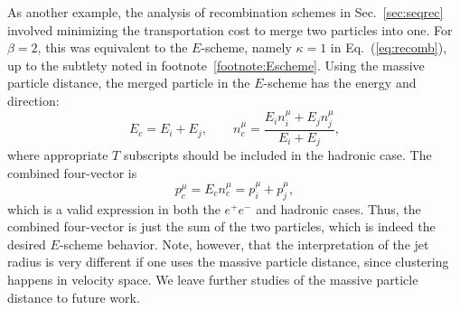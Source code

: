 \documentclass[letterpaper,11pt]{article}
\DeclareRobustCommand{\Sec}[1]{Sec.~\ref{#1}}
\DeclareRobustCommand{\Eq}[1]{Eq.~(\ref{#1})}
\begin{document}
As another example, the analysis of recombination schemes in \Sec{sec:seqrec} involved minimizing the transportation cost to merge two particles into one.
%
For $\beta = 2$, this was equivalent to the $E$-scheme, namely $\kappa = 1$ in \Eq{eq:recomb}, up to the subtlety noted in footnote~\ref{footnote:Escheme}.
%
Using the massive particle distance, the merged particle in the $E$-scheme has the energy and direction:
%
\begin{equation}
%
E_c = E_i + E_j, \qquad n^\mu_c = \frac{E_i n_i^\mu + E_j n_j^\mu}{E_i + E_j},
%
\end{equation}
%
where appropriate $T$ subscripts should be included in the hadronic case.
%
The combined four-vector is
%
\begin{equation}
p^\mu_c = E_c n^\mu_c = p_i^\mu + p_j^\mu,
\end{equation}
%
which is a valid expression in both the $e^+e^-$ and hadronic cases.
%
Thus, the combined four-vector is just the sum of the two particles, which is indeed the desired $E$-scheme behavior.
%
Note, however, that the interpretation of the jet radius is very different if one uses the massive particle distance, since clustering happens in velocity space.
%
We leave further studies of the massive particle distance to future work.



\end{document}
